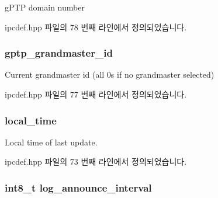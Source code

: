 g\+P\+TP domain number 



ipcdef.\+hpp 파일의 78 번째 라인에서 정의되었습니다.

\subsubsection[{\texorpdfstring{gptp\+\_\+grandmaster\+\_\+id}{gptp_grandmaster_id}}]{ gptp\+\_\+grandmaster\+\_\+id}\hypertarget{structg_ptp_time_data_a91da646ac8f2da272fe3b8941c3f4d54}{}\label{structg_ptp_time_data_a91da646ac8f2da272fe3b8941c3f4d54}


Current grandmaster id (all 0\textquotesingle{}s if no grandmaster selected) 



ipcdef.\+hpp 파일의 77 번째 라인에서 정의되었습니다.

\subsubsection[{\texorpdfstring{local\+\_\+time}{local_time}}]{ local\+\_\+time}\hypertarget{structg_ptp_time_data_a77a3c33b68032d5db3c0c556a80ef651}{}\label{structg_ptp_time_data_a77a3c33b68032d5db3c0c556a80ef651}


Local time of last update. 



ipcdef.\+hpp 파일의 73 번째 라인에서 정의되었습니다.

\subsubsection[{\texorpdfstring{log\+\_\+announce\+\_\+interval}{log_announce_interval}}]{\setlength{\rightskip}{0pt plus 5cm}int8\+\_\+t log\+\_\+announce\+\_\+interval}\hypertarget{structg_ptp_time_data_a15bb50a04ecd3ec11563012afc7e24a7}{}\label{structg_ptp_time_data_a15bb50a04ecd3ec11563012afc7e24a7}


